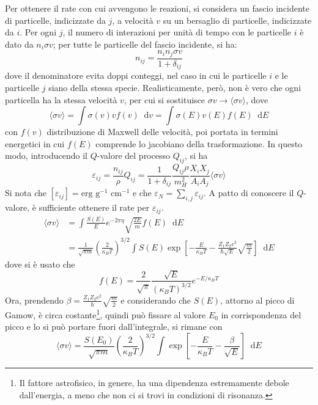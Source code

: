 \documentclass[11pt, a4paper]{scrartcl}
\theoremstyle{style}
\theoremstyle{style1}
\newcommand{\dd}{\mathop{}\!\mathrm{d}}
\numberwithin{equation}{subsection}
\begin{document}
Per ottenere il rate con cui avvengono le reazioni, si considera un fascio incidente di particelle, indicizzate da $j$, a velocit\`a $v$ su un bersaglio di particelle, indicizzate da $i$.
Per ogni $j$, il numero di interazioni per unit\`a di tempo con le particelle $i$ \`e dato da $n_i\sigma v$; per tutte le particelle del fascio incidente, si ha:
\begin{equation}
	n_{ij}  = \frac{n_i n_j \sigma v}{1 + \delta _{ij} }
\end{equation}
dove il denominatore evita doppi conteggi, nel caso in cui le particelle $i$ e le particelle $j$ siano della stessa specie.
Realisticamente, per\`o, non \`e vero che ogni particella ha la stessa velocit\`a $v$, per cui si sostituisce $\sigma v \to \langle \sigma v \rangle$, dove 
\[
\langle \sigma v \rangle = \int \sigma (v) v f(v) \dd v= \int \sigma (E) v(E) f(E) \dd E
\] 
con $f(v)$ distribuzione di Maxwell delle velocit\`a, poi portata in termini energetici in cui $f(E)$ comprende lo jacobiano della trasformazione.
In questo modo, introducendo il $Q$-valore del processo $Q_{ij} $, si ha 
\[
\varepsilon _{ij}  = \frac{n_{ij} }{\rho }Q_{ij}  =  \frac{1}{1+\delta _{ij} }\frac{Q_{ij} \rho }{m_H^2}\frac{X_i X_j}{A_iA_j} \langle \sigma v \rangle
\] 
Si nota che $\left[ \varepsilon _{ij}  \right] = \text{erg g}^{-1}\text{ cm}^{-1}$ e che $\varepsilon _N = \sum_{i,j}^{} \varepsilon _{ij} $.
A patto di conoscere il $Q$-valore, \`e sufficiente ottenere il rate per $\varepsilon _{ij} $. 
\[
	\begin{split}
		\langle \sigma v \rangle &= \int \frac{S(E)}{E}e^{-2\pi \eta } \sqrt{\frac{2E}{m}} f(E) \dd E\\
					 &=\frac{1}{\sqrt{\pi m} } \left(\frac{2}{\kappa _B T}\right) ^{3 / 2} \int S(E) \exp\left[ - \frac{E}{\kappa _B T} - \frac{Z_1Z_2e^2}{\hbar \sqrt{E} } \sqrt{\frac{m}{2}} \right] \dd E
	\end{split}
\] 
dove si \`e usato che 
\[
f(E) = \frac{2}{\sqrt{\pi} }\frac{\sqrt{E} }{(\kappa _B T)^{3 / 2}} e^{-E / \kappa _B T}
\] 
Ora, prendendo $\beta =\frac{Z_1Z_2e^2}{\hbar }\sqrt{\frac{m}{2}}$ e considerando che $S(E)$, attorno al picco di Gamow, \`e circa costante\footnote{Il fattore astrofisico, in genere, ha una dipendenza estremamente debole dall'energia, a meno che non ci si trovi in condizioni di risonanza.}, quindi pu\`o fissare al valore $E_0$ in corrispondenza del picco e lo si pu\`o portare fuori dall'integrale, si rimane con
\[
\langle \sigma v \rangle = \frac{S(E_0)}{\sqrt{\pi m }  } \left(\frac{2}{\kappa _B T}\right) ^{3 / 2} \int \exp\left[ -\frac{E}{\kappa _B T} - \frac{\beta }{\sqrt{E} } \right] \dd E
\] 
\end{document}
